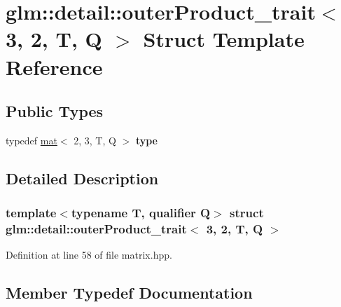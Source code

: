\hypertarget{structglm_1_1detail_1_1outerProduct__trait_3_013_00_012_00_01T_00_01Q_01_4}{}\section{glm\+:\+:detail\+:\+:outer\+Product\+\_\+trait$<$ 3, 2, T, Q $>$ Struct Template Reference}
\label{structglm_1_1detail_1_1outerProduct__trait_3_013_00_012_00_01T_00_01Q_01_4}
\subsection*{Public Types}
\begin{DoxyCompactItemize}
\item 
\mbox{\label{structglm_1_1detail_1_1outerProduct__trait_3_013_00_012_00_01T_00_01Q_01_4_a9513a6759022bd799945791e82f882dd}} 
typedef \hyperlink{structglm_1_1mat}{mat}$<$ 2, 3, T, Q $>$ {\bfseries type}
\end{DoxyCompactItemize}


\subsection{Detailed Description}
\subsubsection*{template$<$typename T, qualifier Q$>$\newline
struct glm\+::detail\+::outer\+Product\+\_\+trait$<$ 3, 2, T, Q $>$}



Definition at line 58 of file matrix.\+hpp.



\subsection{Member Typedef Documentation}
\mbox{\label{structglm_1_1detail_1_1outerProduct__trait_3_013_00_012_00_01T_00_01Q_01_4_a9513a6759022bd799945791e82f882dd}} 
